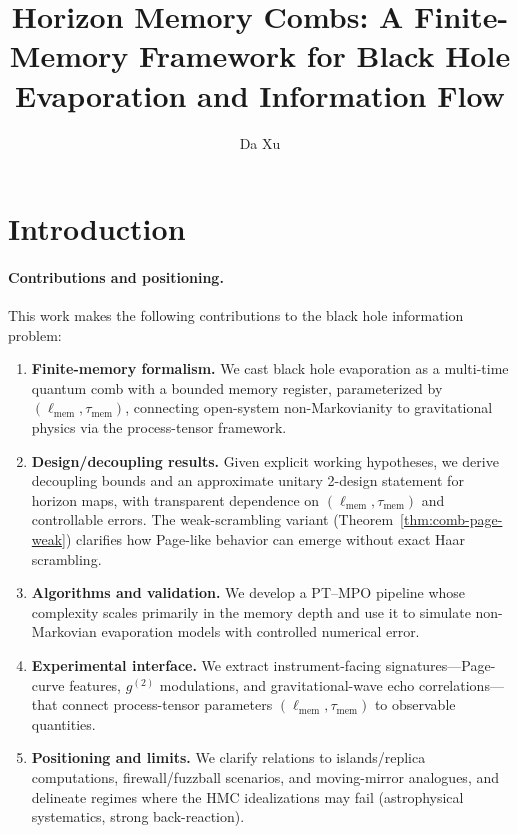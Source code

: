 \documentclass[a4paper,11pt]{article}
\title{Horizon Memory Combs: A Finite-Memory Framework for Black Hole Evaporation and Information Flow}
\author{Da Xu}
\affiliation{China Mobile Research Institute,\\
Beijing, P. R. China}
\newcommand{\HMC}{\textup{\textsc{HMC}}\xspace}
\newcommand{\ellmem}{\ensuremath{\ell_{\mathrm{mem}}}}
\newcommand{\taumem}{\ensuremath{\tau_{\mathrm{mem}}}}
\theoremstyle{plain}
\theoremstyle{definition}
\theoremstyle{remark}
\begin{document}
\maketitle

\flushbottom


\section{Introduction}
\label{sec:intro}

\paragraph{Contributions and positioning.}
This work makes the following contributions to the black hole information problem:
\begin{enumerate}[leftmargin=*,itemsep=0.3em]
  \item \textbf{Finite-memory formalism.} We cast black hole evaporation as a multi-time quantum comb with a bounded memory register, parameterized by $(\ellmem,\taumem)$, connecting open-system non-Markovianity to gravitational physics via the process-tensor framework.
  \item \textbf{Design/decoupling results.} Given explicit working hypotheses, we derive decoupling bounds and an approximate unitary 2-design statement for horizon maps, with transparent dependence on $(\ellmem,\taumem)$ and controllable errors. The weak-scrambling variant (Theorem~\ref{thm:comb-page-weak}) clarifies how Page-like behavior can emerge without exact Haar scrambling.
  \item \textbf{Algorithms and validation.} We develop a PT--MPO pipeline whose complexity scales primarily in the memory depth and use it to simulate non-Markovian evaporation models with controlled numerical error.
  \item \textbf{Experimental interface.} We extract instrument-facing signatures---Page-curve features, $g^{(2)}$ modulations, and gravitational-wave echo correlations---that connect process-tensor parameters $(\ellmem,\taumem)$ to observable quantities.
  \item \textbf{Positioning and limits.} We clarify relations to islands/replica computations, firewall/fuzzball scenarios, and moving-mirror analogues, and delineate regimes where the \HMC{} idealizations may fail (astrophysical systematics, strong back-reaction).
\end{enumerate}
\end{document}

